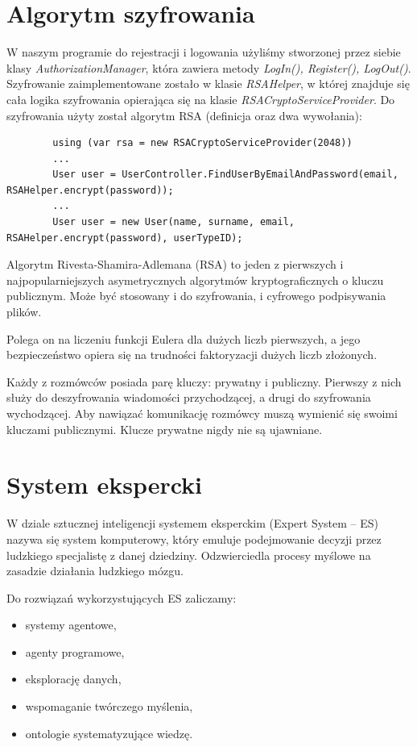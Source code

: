 \documentclass[12pt,a4paper]{article}
\begin{document}
\section*{Algorytm szyfrowania}
	
	
	W naszym programie do rejestracji i logowania użyliśmy stworzonej przez siebie klasy \emph{AuthorizationManager}, która zawiera metody \emph{LogIn(), Register(), LogOut()}.
	Szyfrowanie zaimplementowane zostało w klasie \emph{RSAHelper}, w której znajduje się cała logika szyfrowania opierająca się na klasie \emph{RSACryptoServiceProvider}.
	Do szyfrowania użyty został algorytm RSA (definicja oraz dwa wywołania):
	\begin{lstlisting}
		using (var rsa = new RSACryptoServiceProvider(2048))
		...
		User user = UserController.FindUserByEmailAndPassword(email, RSAHelper.encrypt(password));
		...
		User user = new User(name, surname, email, RSAHelper.encrypt(password), userTypeID);
	\end{lstlisting}

	



	Algorytm Rivesta-Shamira-Adlemana (RSA) to jeden z pierwszych i najpopularniejszych asymetrycznych algorytmów kryptograficznych o kluczu publicznym. Może być stosowany i do szyfrowania, i cyfrowego podpisywania plików.
	
	\smallskip
	Polega on na liczeniu funkcji Eulera dla dużych liczb pierwszych, a jego bezpieczeństwo opiera się na trudności faktoryzacji dużych liczb złożonych.
	
	\smallskip
	Każdy z rozmówców posiada parę kluczy: prywatny i publiczny. Pierwszy z nich służy do deszyfrowania wiadomości przychodzącej, a drugi do szyfrowania wychodzącej. Aby nawiązać komunikację rozmówcy muszą wymienić się swoimi kluczami publicznymi. Klucze prywatne nigdy nie są ujawniane.
	
	
\section*{System ekspercki}

	W dziale sztucznej inteligencji systemem eksperckim (Expert System -- ES) nazywa się system komputerowy, który emuluje podejmowanie decyzji przez ludzkiego specjalistę z danej dziedziny. Odzwierciedla procesy myślowe na zasadzie działania ludzkiego mózgu.
	
	Do rozwiązań wykorzystujących ES zaliczamy:
	\begin{itemize}
		\item systemy agentowe,
		\item agenty programowe,
		\item eksplorację danych,
		\item wspomaganie twórczego myślenia,
		\item ontologie systematyzujące wiedzę.
	\end{itemize}
	\bigskip
	
\end{document}
